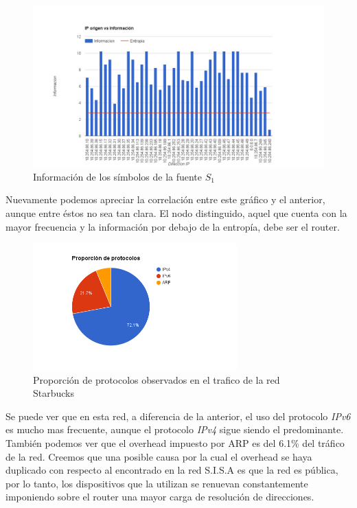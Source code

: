\begin{figure}[H]
  \centering
    \includegraphics[width=1.1\textwidth]{imagenes/starbucks/ip_informacion.png}
  \caption{Información de los símbolos de la fuente $S_1$}
  \label{fig:ejemplo}
\end{figure}

Nuevamente podemos apreciar la correlación entre este gráfico y el anterior, aunque entre éstos no sea tan clara. El nodo distinguido, aquel que cuenta con la mayor frecuencia y la información
por debajo de la entropía, debe ser el router.

\begin{figure}[H]
  \centering
    \includegraphics[width=0.7\textwidth]{imagenes/starbucks/proporcion_protocolos.png}
  \caption{Proporción de protocolos observados en el trafico de la red Starbucks}
  \label{fig:ejemplo}
\end{figure}

Se puede ver que en esta red, a diferencia de la anterior, el uso del protocolo \textit{IPv6} es mucho mas frecuente, aunque el protocolo \textit{IPv4} sigue siendo el predominante. 
También podemos ver que el overhead impuesto por ARP es del 6.1\% del tráfico de la red. Creemos que una posible causa por la cual el overhead se haya duplicado con respecto al 
encontrado en la red S.I.S.A es que la red es pública, por lo tanto, los dispositivos que la utilizan se renuevan constantemente imponiendo sobre el router una mayor carga de resolución
de direcciones.

